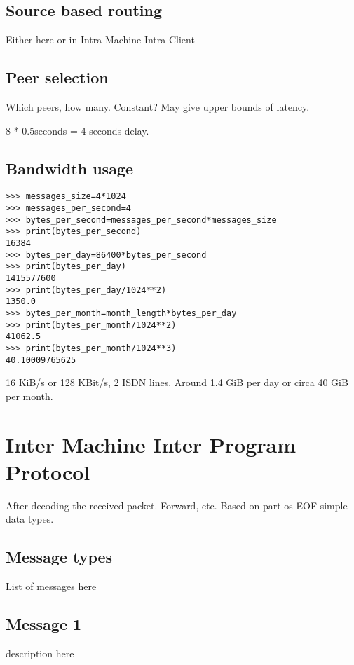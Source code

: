 \subsection{Source based routing}
Either here or in Intra Machine Intra Client
\subsection{Peer selection}
Which peers, how many. Constant? May give upper bounds of latency.

8 * 0.5seconds = 4 seconds delay.

\subsection{Bandwidth usage}
\begin{verbatim}
>>> messages_size=4*1024
>>> messages_per_second=4
>>> bytes_per_second=messages_per_second*messages_size
>>> print(bytes_per_second)
16384
>>> bytes_per_day=86400*bytes_per_second
>>> print(bytes_per_day)
1415577600
>>> print(bytes_per_day/1024**2)
1350.0
>>> bytes_per_month=month_length*bytes_per_day
>>> print(bytes_per_month/1024**2)
41062.5
>>> print(bytes_per_month/1024**3)
40.10009765625
\end{verbatim}
16 KiB/s or 128 KBit/s, 2 ISDN lines. Around 1.4 GiB per day or
circa 40 GiB per month.

\section{Inter Machine Inter Program Protocol}
After decoding the received packet. Forward, etc.
Based on part os EOF simple data types.
\subsection{Message types}
List of messages here
\subsection{Message 1}
description here


